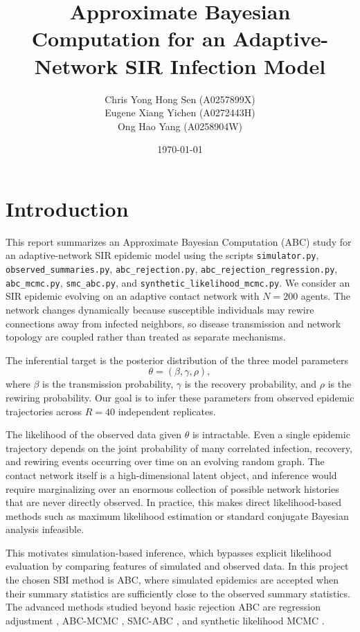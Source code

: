 \documentclass[11pt]{article}
\title{Approximate Bayesian Computation for an Adaptive-Network SIR Infection Model}
\author{
Chris Yong Hong Sen (A0257899X) \\
Eugene Xiang Yichen (A0272443H) \\
Ong Hao Yang (A0258904W)
}
\date{\today}
\begin{document}
\maketitle
\tableofcontents

\section{Introduction}

This report summarizes an Approximate Bayesian Computation (ABC) study for an adaptive-network SIR epidemic model using the scripts
\texttt{simulator.py},
\texttt{observed\_summaries.py},
\texttt{abc\_rejection.py},
\texttt{abc\_rejection\_regression.py},
\texttt{abc\_mcmc.py},
\texttt{smc\_abc.py}, and
\texttt{synthetic\_likelihood\_mcmc.py}.
We consider an SIR epidemic evolving on an adaptive contact network with $N = 200$ agents. The network changes dynamically because susceptible individuals may rewire connections away from infected neighbors, so disease transmission and network topology are coupled rather than treated as separate mechanisms.

The inferential target is the posterior distribution of the three model parameters
\[
\theta = (\beta,\gamma,\rho),
\]
where $\beta$ is the transmission probability, $\gamma$ is the recovery probability, and $\rho$ is the rewiring probability. Our goal is to infer these parameters from observed epidemic trajectories across $R = 40$ independent replicates.

The likelihood of the observed data given $\theta$ is intractable. Even a single epidemic trajectory depends on the joint probability of many correlated infection, recovery, and rewiring events occurring over time on an evolving random graph. The contact network itself is a high-dimensional latent object, and inference would require marginalizing over an enormous collection of possible network histories that are never directly observed. In practice, this makes direct likelihood-based methods such as maximum likelihood estimation or standard conjugate Bayesian analysis infeasible.

This motivates simulation-based inference, which bypasses explicit likelihood evaluation by comparing features of simulated and observed data. In this project the chosen SBI method is ABC, where simulated epidemics are accepted when their summary statistics are sufficiently close to the observed summary statistics. The advanced methods studied beyond basic rejection ABC are regression adjustment \citep{beaumont2002}, ABC-MCMC \citep{marjoram2003}, SMC-ABC \citep{beaumont2009}, and synthetic likelihood MCMC \citep{wood2010}.
\end{document}

